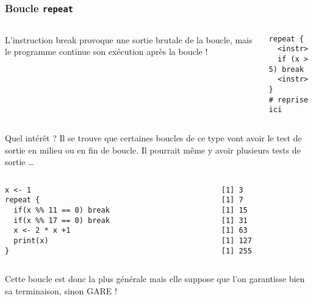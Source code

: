 \documentclass[10pt]{beamer}
\begin{document}
\begin{frame}[fragile]
  \frametitle{Boucle \texttt{repeat}}
\begin{columns}[c]
\begin{column}{0.63\textwidth}
  L'instruction break provoque une sortie brutale de la boucle, mais le programme continue son exécution après la boucle !
\end{column}
\begin{column}{0.33\textwidth}
  \begin{lstlisting}[style=edblock]
repeat {
  <instr>
  if (x > 5) break
  <instr>
}
# reprise ici 
\end{lstlisting}
\end{column}
\end{columns}



Quel intérêt ? Il se trouve que certaines boucles de ce type vont avoir le test de sortie en milieu ou en fin de boucle.
Il pourrait même y avoir plusieurs tests de sortie \dots

\begin{columns}[c]
\begin{column}{0.48\textwidth}
\begin{lstlisting}[style=editor]
x <- 1
repeat {
  if(x %% 11 == 0) break
  if(x %% 17 == 0) break
  x <- 2 * x +1
  print(x)
}  
\end{lstlisting}

\end{column}
\begin{column}{0.1\textwidth}
  \RUN
\end{column}

\begin{column}{0.28\textwidth}
  \begin{lstlisting}
[1] 3
[1] 7
[1] 15
[1] 31
[1] 63
[1] 127
[1] 255    
  \end{lstlisting}
\end{column}
\end{columns}
Cette boucle est donc la plus générale mais elle suppose que l'on garantisse bien sa terminaison, sinon GARE !
\end{frame}

 \questionSlide

 \appendix
 \backupSlides
\end{document}
